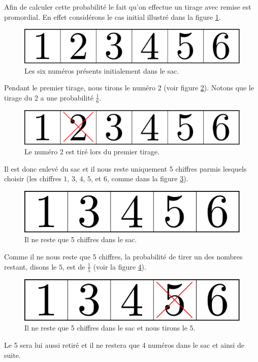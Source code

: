 \documentclass[a4paper,12pt]{book}
\begin{document}
Afin de calculer cette probabilité le fait qu'on effectue un tirage avec remise est promordial.
En effet considérons le cas initial illustré dans la figure \ref{fig_loto}.
\begin{figure}[htp]
\includegraphics[height=1.8truecm]{figs/loto.pdf}
\caption{Les six numéros présents initialement dans le sac.}\label{fig_loto}
\end{figure}
Pendant le premier tirage, nous tirons le numéro 2 (voir figure \ref{fig_loto2}). Notons que le tirage du 2 a une probabilité $\frac{1}{6}$.
\begin{figure}[htp]
\includegraphics[height=1.8truecm]{figs/loto2.pdf}
\caption{Le numéro 2 est tiré lors du premier tirage.}\label{fig_loto2}
\end{figure}
Il est donc enlevé du sac et il nous reste uniquement 5 chiffres parmis lesquels choisir 
(les chiffres $1$, $3$, $4$, $5$, et $6$, comme dans la figure \ref{fig_loto3}).
\begin{figure}[htp]
\includegraphics[height=1.8truecm]{figs/loto3.pdf}
\caption{Il ne reste que 5 chiffres dans le sac.}\label{fig_loto3}
\end{figure}
Comme il ne nous reste que 5 chiffres, la probabilité de tirer un des nombres restant, 
disons le $5$, est de $\frac{1}{5}$ (voir la figure \ref{fig_loto4}). 
\begin{figure}[htp]
\includegraphics[height=1.8truecm]{figs/loto4.pdf}
\caption{Il ne reste que 5 chiffres dans le sac et nous tirons le 5.}\label{fig_loto4}
\end{figure}
Le 5 sera lui aussi retiré et il ne restera que 4 numéros dans le sac et ainsi de suite. 
\end{document}
